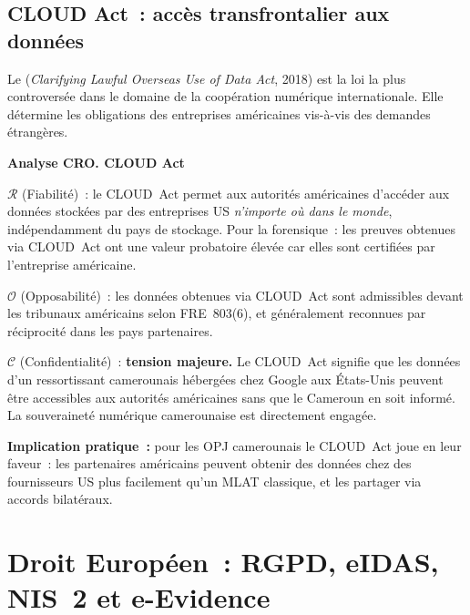 \subsection{CLOUD Act~: accès transfrontalier aux données}

Le  (\textit{Clarifying Lawful Overseas
Use of Data Act}, 2018) est la loi la plus controversée dans le domaine de
la coopération numérique internationale. Elle détermine les obligations
des entreprises américaines vis-à-vis des demandes étrangères.

\begin{boxCRO}
\textbf{Analyse CRO. CLOUD Act}

$\mathcal{R}$ (Fiabilité)~: le CLOUD~Act permet aux autorités américaines
d'accéder aux données stockées par des entreprises US \emph{n'importe où
dans le monde}, indépendamment du pays de stockage. Pour la forensique~:
les preuves obtenues via CLOUD~Act ont une valeur probatoire élevée car
elles sont certifiées par l'entreprise américaine.

$\mathcal{O}$ (Opposabilité)~: les données obtenues via CLOUD~Act sont
admissibles devant les tribunaux américains selon FRE~803(6), et
généralement reconnues par réciprocité dans les pays partenaires.

$\mathcal{C}$ (Confidentialité)~: \textbf{tension majeure.} Le CLOUD~Act
signifie que les données d'un ressortissant camerounais hébergées chez
Google aux États-Unis peuvent être accessibles aux autorités américaines
sans que le Cameroun en soit informé. La souveraineté numérique
camerounaise est directement engagée.


\textbf{Implication pratique~:} pour les OPJ camerounais le CLOUD~Act
joue en leur faveur~: les partenaires américains peuvent obtenir des données
chez des fournisseurs US plus facilement qu'un MLAT classique, et les
partager via accords bilatéraux.
\end{boxCRO}

\section{Droit Européen~: RGPD, eIDAS, NIS~2 et e-Evidence}
\label{sec:droit-europe}

